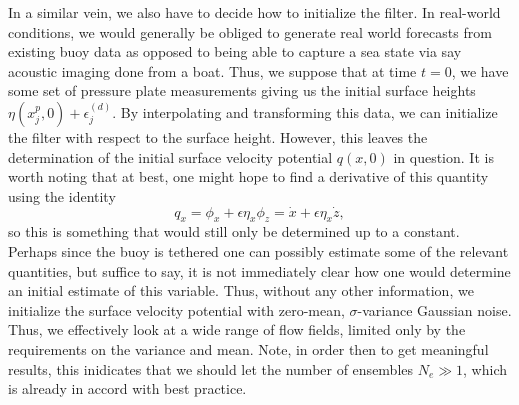 In a similar vein, we also have to decide how to initialize the filter.  In real-world conditions, we would generally be obliged to generate real world forecasts from existing buoy data as opposed to being able to capture a sea state via say acoustic imaging done from a boat.  Thus, we suppose that at time $t=0$, we have some set of pressure plate measurements giving us the initial surface heights $\eta(x_{j}^{p},0) + \epsilon^{(d)}_{j}$.  By interpolating and transforming this data, we can initialize the filter with respect to the surface height.  However, this leaves the determination of the initial surface velocity potential $q(x,0)$ in question.  It is worth noting that at best, one might hope to find a derivative of this quantity using the identity
\[
q_{x} = \phi_{x} + \epsilon \eta_{x}\phi_{z} = \dot{x} + \epsilon \eta_{x}\dot{z},
\]
so this is something that would still only be determined up to a constant.  Perhaps since the buoy is tethered one can possibly estimate some of the relevant quantities, but suffice to say, it is not immediately clear how one would determine an initial estimate of this variable.  Thus, without any other information, we initialize the surface velocity potential with zero-mean, $\sigma$-variance Gaussian noise.  Thus, we effectively look at a wide range of flow fields, limited only by the requirements on the variance and mean.  Note, in order then to get meaningful results, this inidicates that we should let the number of ensembles $N_{e}\gg1$, which is already in accord with best practice.  